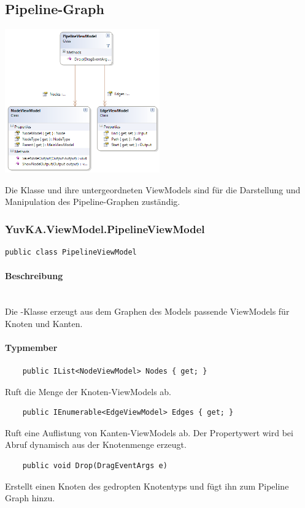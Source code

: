 \subsection{Pipeline-Graph}

\begin{center}	
\includegraphics[width=0.5\textwidth]{YuvKA.ViewModel/pipeline.png}
\end{center}
Die Klasse  und ihre untergeordneten ViewModels sind für die Darstellung und Manipulation des Pipeline-Graphen zuständig.

\subsubsection{YuvKA.ViewModel.PipelineViewModel}

\begin{verbatim}
public class PipelineViewModel
\end{verbatim}

\paragraph{Beschreibung}~\\
Die -Klasse erzeugt aus dem Graphen des Models passende ViewModels für Knoten und Kanten.

\paragraph{Typmember}
\begin{itemize}

	\begin{verbatim}
	public IList<NodeViewModel> Nodes { get; }
	\end{verbatim}
	Ruft die Menge der Knoten-ViewModels ab.

	\begin{verbatim}
	public IEnumerable<EdgeViewModel> Edges { get; }
	\end{verbatim}
	Ruft eine Auflistung von Kanten-ViewModels ab. Der Propertywert wird bei Abruf dynamisch aus der Knotenmenge erzeugt.

	\begin{verbatim}
	public void Drop(DragEventArgs e)
	\end{verbatim}
	Erstellt einen Knoten des gedropten Knotentyps und fügt ihn zum Pipeline Graph hinzu.

\end{itemize}

